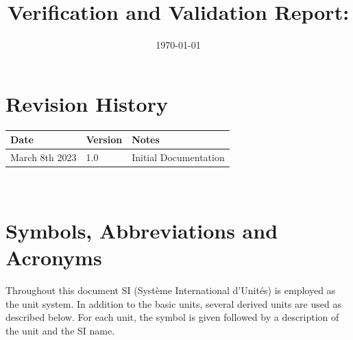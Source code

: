 \documentclass[12pt, titlepage]{article}
\begin{document}
\title{Verification and Validation Report: \progname}
\author{\authname}
\date{\today}

\maketitle


\section{Revision History}

\begin{tabularx}{\textwidth}{p{3cm}p{2cm}X}
  \toprule {\bf Date} & {\bf Version} & {\bf Notes} \\
  \midrule
  March 8th 2023              & 1.0           & Initial Documentation       \\
  \bottomrule
\end{tabularx}

~\newpage

\section{Symbols, Abbreviations and Acronyms}


Throughout this document SI (Syst\`{e}me International d'Unit\'{e}s) is employed
as the unit system.  In addition to the basic units, several derived units are
used as described below.  For each unit, the symbol is given followed by a
description of the unit and the SI name.
~\newline
\end{document}
